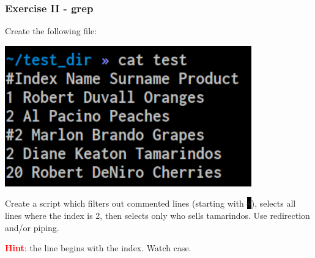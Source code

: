 \documentclass[unknownkeysallowed, 10pt, a4 paper, handout]{beamer}
\newcommand{\focus}[1]{\textbf{\textcolor{red}{#1}}}
\newcommand{\code}[1]{\colorbox{black}{\color{green}\texttt{#1}}}
\newcommand{\sidebyside}[5]{
  \begin{minipage}{#1\textwidth}
    #2
  \end{minipage} #3 \begin{minipage}{#4\textwidth}
    #5
  \end{minipage}
}
\begin{document}
\begin{frame}
  \begin{center}
    \frametitle{Exercise II - grep}

    \sidebyside{0.35}{
      Create the following file:
    }{\hfill}{0.60}{
      \begin{center}
        \includegraphics[width=0.80\textwidth]{pics/ex_2.png}
      \end{center}
    }

    \vspace{6mm}

    Create a script which filters out commented lines (starting with
    \code{\#}), selects all lines where the index is 2, then selects only who
    sells tamarindos. Use redirection and/or piping.

    \vspace{6mm}

    \focus{Hint}: the line begins with the index. Watch case.
  \end{center}
\end{frame}
\end{document}
